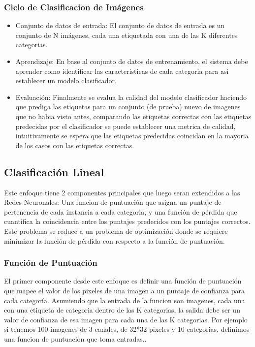 \documentclass[a4paper,11pt,spanish]{book}
\begin{document}
	\subsubsection {Ciclo de Clasificacion de Imágenes}
	  \begin{itemize}
	    \item Conjunto de datos de entrada: El conjunto de datos de entrada es un conjunto de N imágenes, cada una etiquetada con una de las K diferentes categorias.  
	    \item Aprendizaje: En base al conjunto de datos de entrenamiento, el sistema debe aprender como identificar las caracteristicas de cada categoria para asi establecer un modelo clasificador.
	    \item Evaluación: Finalmente se evalua la calidad del modelo clasificador haciendo que prediga las etiquetas para un conjunto (de prueba) nuevo de imagenes que no habia visto antes, comparando las 
	    etiquetas correctas con las etiquetas predecidas por el clasificador se puede establecer una metrica de calidad, intuitivamente se espera que las etiquetas predecidas coincidan en la mayoria
	    de los casos con las etiquetas correctas.
	  \end{itemize}
      
    \subsection{Clasificación Lineal}
      Este enfoque tiene 2 componentes principales que luego seran extendidos a las Redes Neuronales: Una funcion de puntuación que asigna un puntaje de pertenencia de cada instancia a cada categoria, 
      y una función de pérdida que cuantifica la coincidencia entre los puntajes predecidos con los puntajes correctos.
      Este problema se reduce a un problema de optimización donde se requiere minimizar la función de pérdida con respecto a la función de puntuación.

      \subsubsection{Función de Puntuación}
	El primer componente desde este enfoque es definir una función de  puntuación que mapee el valor de los pixeles de una imagen a un puntaje de confianza para cada categoría.
	Asumiendo que la entrada de la funcion son imagenes, cada una con una etiqueta de categoria dentro de las K categorias, la salida debe ser un valor de confianza de esa imagen 
	para cada una de las K categorias.
	Por ejemplo si tenemos 100 imagenes de 3 canales, de 32*32 pixeles y 10 categorias, definimos una funcion de puntuacion que toma entradas..
\end{document}
